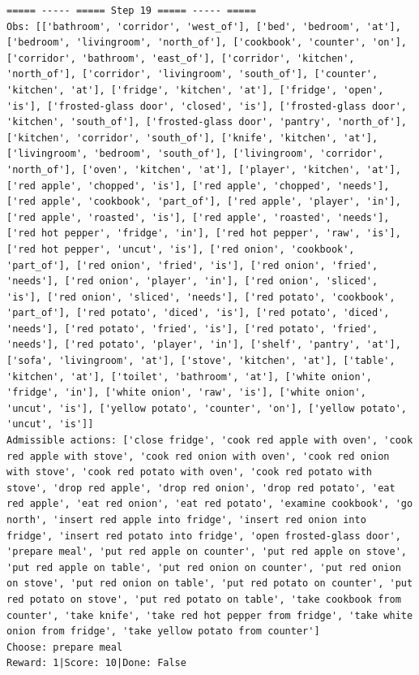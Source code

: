 \documentclass[11pt]{article}
\begin{document}
\begin{lstlisting}
===== ----- ===== Step 19 ===== ----- =====
Obs: [['bathroom', 'corridor', 'west_of'], ['bed', 'bedroom', 'at'], ['bedroom', 'livingroom', 'north_of'], ['cookbook', 'counter', 'on'], ['corridor', 'bathroom', 'east_of'], ['corridor', 'kitchen', 'north_of'], ['corridor', 'livingroom', 'south_of'], ['counter', 'kitchen', 'at'], ['fridge', 'kitchen', 'at'], ['fridge', 'open', 'is'], ['frosted-glass door', 'closed', 'is'], ['frosted-glass door', 'kitchen', 'south_of'], ['frosted-glass door', 'pantry', 'north_of'], ['kitchen', 'corridor', 'south_of'], ['knife', 'kitchen', 'at'], ['livingroom', 'bedroom', 'south_of'], ['livingroom', 'corridor', 'north_of'], ['oven', 'kitchen', 'at'], ['player', 'kitchen', 'at'], ['red apple', 'chopped', 'is'], ['red apple', 'chopped', 'needs'], ['red apple', 'cookbook', 'part_of'], ['red apple', 'player', 'in'], ['red apple', 'roasted', 'is'], ['red apple', 'roasted', 'needs'], ['red hot pepper', 'fridge', 'in'], ['red hot pepper', 'raw', 'is'], ['red hot pepper', 'uncut', 'is'], ['red onion', 'cookbook', 'part_of'], ['red onion', 'fried', 'is'], ['red onion', 'fried', 'needs'], ['red onion', 'player', 'in'], ['red onion', 'sliced', 'is'], ['red onion', 'sliced', 'needs'], ['red potato', 'cookbook', 'part_of'], ['red potato', 'diced', 'is'], ['red potato', 'diced', 'needs'], ['red potato', 'fried', 'is'], ['red potato', 'fried', 'needs'], ['red potato', 'player', 'in'], ['shelf', 'pantry', 'at'], ['sofa', 'livingroom', 'at'], ['stove', 'kitchen', 'at'], ['table', 'kitchen', 'at'], ['toilet', 'bathroom', 'at'], ['white onion', 'fridge', 'in'], ['white onion', 'raw', 'is'], ['white onion', 'uncut', 'is'], ['yellow potato', 'counter', 'on'], ['yellow potato', 'uncut', 'is']]
Admissible actions: ['close fridge', 'cook red apple with oven', 'cook red apple with stove', 'cook red onion with oven', 'cook red onion with stove', 'cook red potato with oven', 'cook red potato with stove', 'drop red apple', 'drop red onion', 'drop red potato', 'eat red apple', 'eat red onion', 'eat red potato', 'examine cookbook', 'go north', 'insert red apple into fridge', 'insert red onion into fridge', 'insert red potato into fridge', 'open frosted-glass door', 'prepare meal', 'put red apple on counter', 'put red apple on stove', 'put red apple on table', 'put red onion on counter', 'put red onion on stove', 'put red onion on table', 'put red potato on counter', 'put red potato on stove', 'put red potato on table', 'take cookbook from counter', 'take knife', 'take red hot pepper from fridge', 'take white onion from fridge', 'take yellow potato from counter']
Choose: prepare meal
Reward: 1|Score: 10|Done: False


\end{lstlisting}
\end{document}
